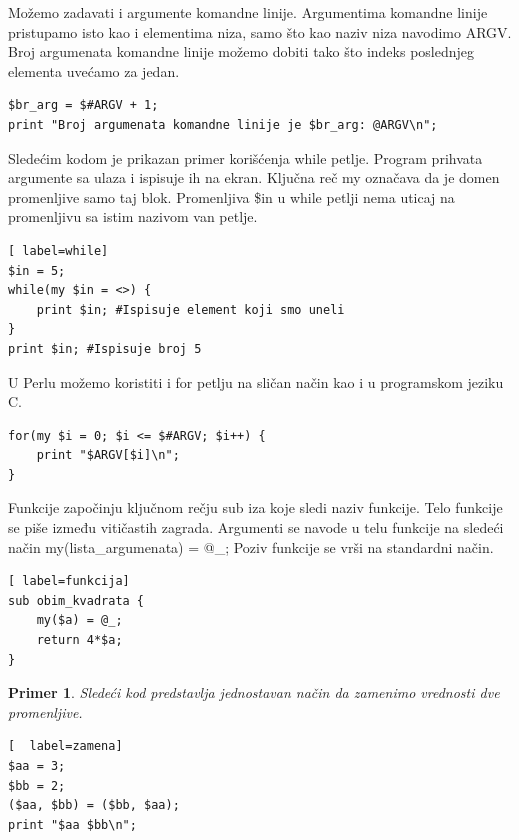 \documentclass[a4paper]{article}
\newtheorem{primer}{Primer}[section]
\begin{document}
Možemo zadavati i argumente komandne linije. Argumentima komandne linije pristupamo isto kao i elementima niza, samo što kao naziv niza navodimo ARGV. Broj argumenata komandne linije možemo dobiti tako što indeks poslednjeg elementa uvećamo za jedan.
\begin{lstlisting}[label=argv]
$br_arg = $#ARGV + 1;
print "Broj argumenata komandne linije je $br_arg: @ARGV\n";
\end{lstlisting}
Sledećim kodom je prikazan primer korišćenja while petlje. Program prihvata argumente sa ulaza i ispisuje ih na ekran. Ključna reč my označava da je domen promenljive samo taj blok. Promenljiva \$in u while petlji nema uticaj na promenljivu sa istim nazivom van petlje.
\begin{lstlisting}[ label=while]
$in = 5;
while(my $in = <>) {
    print $in; #Ispisuje element koji smo uneli
}
print $in; #Ispisuje broj 5
\end{lstlisting}
U Perlu možemo koristiti i for petlju na sličan način kao i u programskom jeziku C.
\begin{lstlisting}[label=for]
for(my $i = 0; $i <= $#ARGV; $i++) {
    print "$ARGV[$i]\n";
}
\end{lstlisting}
Funkcije započinju ključnom rečju sub iza koje sledi naziv funkcije. Telo funkcije se piše između vitičastih zagrada. Argumenti se navode u telu funkcije na sledeći način my(lista\_argumenata) = @\_; Poziv funkcije se vr\v si na standardni na\v cin.
\begin{lstlisting}[ label=funkcija]
sub obim_kvadrata {
    my($a) = @_;
    return 4*$a;
}
\end{lstlisting}

\begin{primer}
Sledeći kod predstavlja jednostavan način da zamenimo vrednosti dve promenljive.
\begin{lstlisting}[  label=zamena]
$aa = 3;
$bb = 2;
($aa, $bb) = ($bb, $aa);
print "$aa $bb\n";

\end{lstlisting}

\end{primer}
\end{document}
